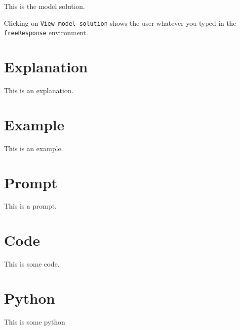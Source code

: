 \documentclass{ximera}
\begin{document}
\begin{freeResponse}
  This is the model solution.
\end{freeResponse}

\begin{remark}
Clicking on \verb!View model solution! shows the user
whatever you typed in the  \verb!freeResponse! environment.
\end{remark}



\section{Explanation}

\begin{explanation}
This is an explanation.
\end{explanation}



\section{Example}

\begin{example}
This is an example.
\end{example}



\section{Prompt}

\begin{prompt}
This is a prompt.
\end{prompt}



\section{Code}

\begin{code}
This is some code.
\end{code}



\section{Python}

\begin{python}
This is some python
\end{python}
\end{document}

